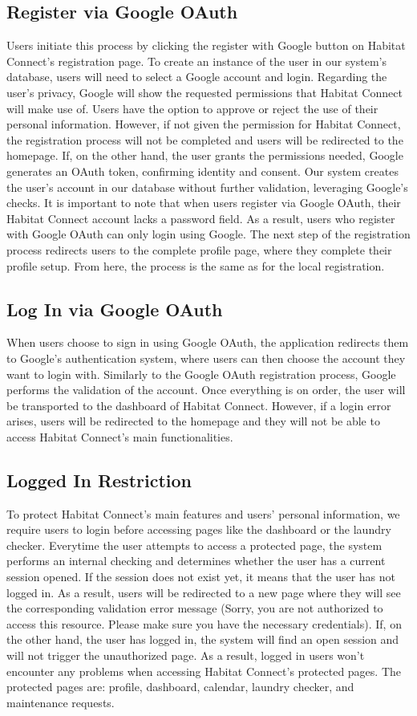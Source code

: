 \documentclass[conference]{IEEEtran}
\begin{document}
\subsection{Register via Google OAuth}
Users initiate this process by clicking the register with Google button on Habitat Connect's registration page. To create an instance of the user in our system’s database, users will need to select a Google account and login. Regarding the user’s privacy, Google will show the requested permissions that Habitat Connect will make use of.  Users have the option to approve or reject the use of their personal information. However, if not given the permission for Habitat Connect, the registration process will not be completed and users will be redirected to the homepage. If, on the other hand, the user grants the permissions needed, Google generates an OAuth token, confirming identity and consent. Our system creates the user's account in our database without further validation, leveraging Google's checks. It is important to note that when users register via Google OAuth, their Habitat Connect account lacks a password field. As a result, users who register with Google OAuth can only login using Google.
The next step of the registration process redirects users to the complete profile page, where they complete their profile setup. From here, the process is the same as for the local registration.
\subsection{Log In via Google OAuth}
When users choose to sign in using Google OAuth, the application redirects them to Google's authentication system, where users can then choose the account they want to login with. Similarly to the Google OAuth registration process, Google performs the validation of the account. Once everything is on order, the user will be transported to the dashboard of Habitat Connect. However, if a login error arises, users will be redirected to the homepage and they will not be able to access Habitat Connect’s main functionalities.
\subsection{Logged In Restriction}
To protect Habitat Connect’s main features and users’ personal information, we require users to login before accessing pages like the dashboard or the laundry checker. Everytime the user attempts to access a protected page, the system performs an internal checking and determines whether the user has a current session opened. If the session does not exist yet, it means that the user has not logged in. As a result, users will be redirected to a new page where they will see the corresponding validation error message (Sorry, you are not authorized to access this resource. Please make sure you have the necessary credentials). If, on the other hand, the user has logged in, the system will find an open session and will not trigger the unauthorized page. As a result, logged in users won’t encounter any problems when accessing Habitat Connect’s protected pages. The protected pages are: profile, dashboard, calendar, laundry checker, and maintenance requests.
\end{document}
